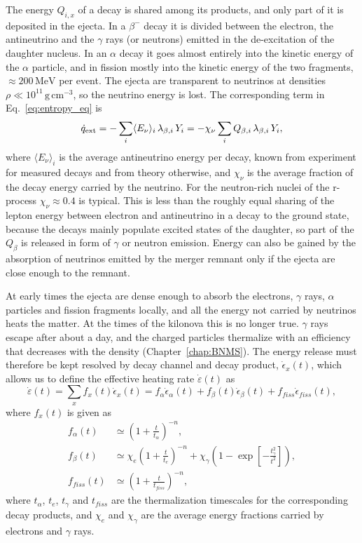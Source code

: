 The energy $Q_{i,x}$ of a decay is shared among its products, and only part of it is deposited in the ejecta.
In a $\beta^-$ decay it is divided between the electron, the antineutrino and the $\gamma$ rays (or neutrons) emitted in the de-excitation of the daughter nucleus.
In an $\alpha$ decay it goes almost entirely into the kinetic energy of the $\alpha$ particle, and in fission mostly into the kinetic energy of the two fragments, $\approx200\,\mathrm{MeV}$ per event.
The ejecta are transparent to neutrinos at densities $\rho\ll10^{11}\,\mathrm{g\,cm^{-3}}$, so the neutrino energy is lost.
The corresponding term in Eq.~\ref{eq:entropy_eq} is
\begin{equation}\label{eq:qnu}
  \dot q_{\rm ext}=-\sum_i\langle E_\nu\rangle_i\,\lambda_{\beta,i}\,Y_i=-\chi_\nu\sum_iQ_{\beta,i}\,\lambda_{\beta,i}\,Y_i,
\end{equation}
where $\langle E_\nu\rangle_i$ is the average antineutrino energy per decay, known from experiment for measured decays and from theory otherwise, and $\chi_\nu$ is the average fraction of the decay energy carried by the neutrino.
For the neutron-rich nuclei of the r-process $\chi_\nu\approx0.4$ is typical.
This is less than the roughly equal sharing of the lepton energy between electron and antineutrino in a decay to the ground state, because the decays mainly populate excited states of the daughter,
so part of the $Q_\beta$ is released in form of $\gamma$ or neutron emission.
Energy can also be gained by the absorption of neutrinos emitted by the merger remnant only if the ejecta are close enough to the remnant.

At early times the ejecta are dense enough to absorb the electrons, $\gamma$ rays, $\alpha$ particles and fission fragments locally, and all the energy not carried by neutrinos heats the matter.
At the times of the kilonova this is no longer true.
$\gamma$ rays escape after about a day, and the charged particles thermalize with an efficiency that decreases with the density (Chapter~\ref{chap:BNMS}).
The energy release must therefore be kept resolved by decay channel and decay product, $\dot\epsilon_x(t)$, which allows us to define the effective heating rate $\dot \varepsilon(t)$ as
\begin{equation}
  \dot \varepsilon(t)=\sum_xf_x(t)\dot\epsilon_x(t)=f_\alpha\dot\epsilon_\alpha(t)+f_\beta(t)\dot\epsilon_\beta(t)+f_{fiss}\dot\epsilon_{fiss}(t),
\end{equation}
where $f_x(t)$ is given as 
\begin{align}
  f_\alpha(t)&\simeq\left(1+\frac{t}{t_\alpha}\right)^{-n},\\
  f_\beta(t)&\simeq\chi_e\left(1+\frac{t}{t_e}\right)^{-n}+\chi_\gamma\left(1-\exp\left[-\frac{t_\gamma^2}{t^2}\right]\right),\\
  f_{fiss}(t)&\simeq\left(1+\frac{t}{t_{fiss}}\right)^{-n},
\end{align} 
where $t_\alpha$, $t_e$, $t_\gamma$ and $t_{fiss}$ are the thermalization timescales for the corresponding decay products, and $\chi_e$ and $\chi_\gamma$ are the average energy fractions carried by electrons and $\gamma$ rays.

